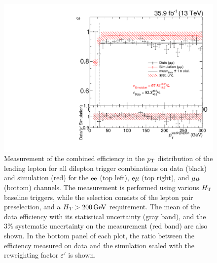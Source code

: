 \begin{figure}[htb]
 \includegraphics[width=\pairwidth]{figures/triggerStudies/efficiency_dataHT_trigDilep_MM_pt1}
 \caption{Measurement of the combined efficiency in the $p_{\mathrm{T}}$ distribution of the leading lepton for all dilepton trigger combinations on data (black) and simulation (red) for the $\mathrm{e}\mathrm{e}$ (top left), $\mathrm{e}\mu$ (top right), and $\mu\mu$ (bottom) channels. The measurement is performed using various $H_{\mathrm{T}}$ baseline triggers, while the selection consists of the lepton pair preselection, and a $H_{\mathrm{T}}>200\,\text{Ge\hspace{-.08em}V}$ requirement. The mean of the data efficiency with its statistical uncertainty (gray band), and the $3\%$ systematic uncertainty on the measurement (red band) are also shown. In the bottom panel of each plot, the ratio between the efficiency measured on data and the simulation scaled with the reweighting factor $\varepsilon'$ is shown.}
 \label{fig:app_triggEff}
\end{figure}

